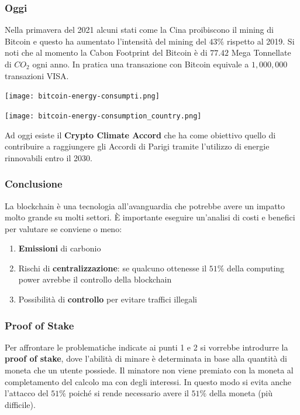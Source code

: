 \subsubsection{Oggi}
Nella primavera del 2021 alcuni stati come la Cina proibiscono il mining di Bitcoin e questo ha aumentato l'intensità del mining del $43\%$ rispetto al 2019. Si noti che al momento la Cabon Footprint del Bitcoin è di $77.42$ Mega Tonnellate di $CO_2$ ogni anno. In pratica una transazione con Bitcoin equivale a $1,000,000$ transazioni VISA.
\begin{center}
	\texttt{[image: bitcoin-energy-consumpti.png]}
\end{center}
\begin{center}
	\texttt{[image: bitcoin-energy-consumption\_country.png]}
\end{center}

Ad oggi esiste il \textbf{Crypto Climate Accord} che ha come obiettivo quello di contribuire a raggiungere gli Accordi di Parigi tramite l'utilizzo di energie rinnovabili entro il 2030.

\subsubsection{Conclusione}
La blockchain è una tecnologia all'avanguardia che potrebbe avere un impatto molto grande su molti settori. È importante eseguire un'analisi di costi e benefici per valutare se conviene o meno:
\begin{enumerate}
	\item \textbf{Emissioni} di carbonio
	\item Rischi di \textbf{centralizzazione}: se qualcuno ottenesse il $51\%$ della computing power avrebbe il controllo della blockchain
	\item Possibilità di \textbf{controllo} per evitare traffici illegali
\end{enumerate}

\subsubsection{Proof of Stake}
Per affrontare le problematiche indicate ai punti 1 e 2 si vorrebbe introdurre la \textbf{proof of stake}, dove l'abilità di minare è determinata in base alla quantità di moneta che un utente possiede. Il minatore non viene premiato con la moneta al completamento del calcolo ma con degli interessi. In questo modo si evita anche l'attacco del $51\%$ poiché si rende necessario avere il $51\%$ della moneta (più difficile).